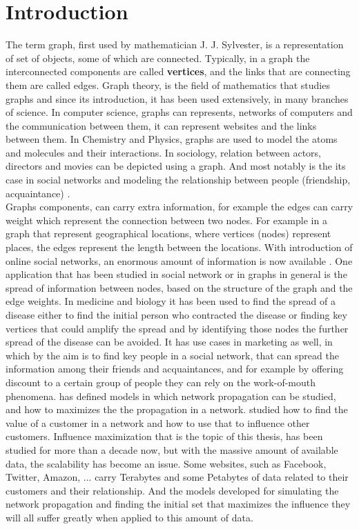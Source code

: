\documentclass[english]{tktltiki}
\begin{document}
\section{Introduction}
The term graph, first used by mathematician J. J. Sylvester, is a representation of set of objects, some of which are connected. Typically, in a graph the interconnected components are called \textbf{vertices}, and the links that are connecting them are called edges. Graph theory, is the field of mathematics that studies graphs and since its introduction, it has been used extensively, in many branches of science. In computer science, graphs can represents, networks of computers and the communication between them, it can represent websites and the links between them. In Chemistry and Physics, graphs are used to model the atoms and molecules and their interactions. In sociology, relation between actors, directors and movies can be depicted using a graph. And most notably is the its case in social networks and modeling the relationship between people (friendship, acquaintance) . \\
Graphs components, can carry extra information, for example the edges can carry weight which represent the connection between two nodes. For example in a graph that represent geographical locations, where vertices (nodes) represent places, the edges represent the length between the locations. 
With introduction of online social networks, an enormous amount of information is now available . One application that has been studied in social network or in graphs in general is the spread of information between nodes, based on the structure of the graph and the edge weights. In medicine and biology it has been used to find the spread of a disease either to find the initial person who contracted the disease or finding key vertices that could amplify the spread and by identifying those nodes the further spread of the disease can be avoided. It has use cases in marketing as well, in which by the aim is to find key people in a social network, that can spread the information among their friends and acquaintances, and for example by offering discount to a certain group of people they can rely on the work-of-mouth phenomena. \cite{kempe03} has defined models in which network propagation can be studied, and how to maximizes the the propagation in a network. \cite{domingo01} studied how to find the value of a customer in a network and how to use that to influence other customers. Influence maximization that is the topic of this thesis, has been studied for more than a decade now, but with the massive amount of available data, the scalability has become an issue. Some websites, such as Facebook, Twitter, Amazon, ... carry Terabytes and some Petabytes of data related to their customers and their relationship. And the models developed for simulating the network propagation and finding the initial set that maximizes the influence they will all suffer greatly when applied to this amount of data. \\
\end{document}

